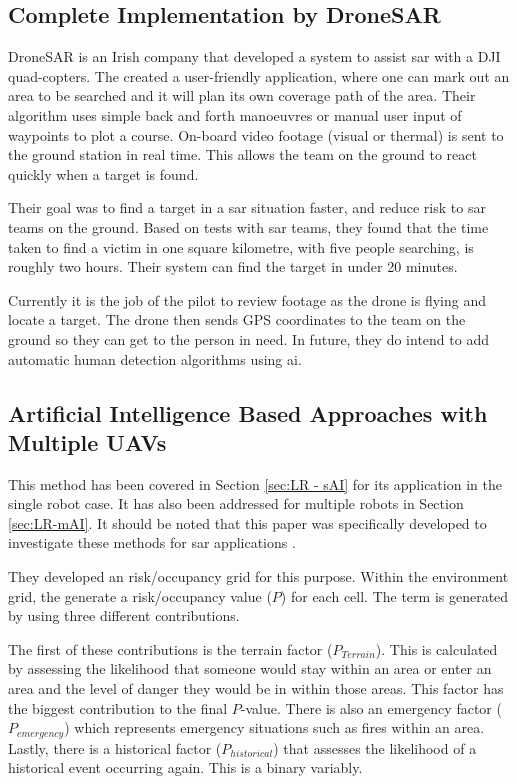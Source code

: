 \subsection{Complete Implementation by DroneSAR}
\label{sec:LR SAR-DroneSAR}
DroneSAR is an Irish company that developed a system to assist \acl{sar} with a DJI quad-copters. The created a user-friendly application, where one can mark out an area to be searched and it will plan its own coverage path of the area. Their algorithm uses simple back and forth manoeuvres or manual user input of waypoints to plot a course. On-board video footage (visual or thermal) is sent to the ground station in real time. This allows the team on the ground to react quickly when a target is found.  \cite{DroneSAR01}

Their goal was to find a target in a \acl{sar} situation faster, and reduce risk to \ac{sar} teams on the ground. Based on tests with \acl{sar} teams, they found that the time taken to find a victim in one square kilometre, with five people searching, is roughly two hours. Their system can find the target in under 20 minutes. \cite{DroneSAR01}
 
Currently it is the job of the pilot to review footage as the drone is flying and locate a target. The drone then sends GPS coordinates to the team on the ground so they can get to the person in need. In future, they do intend to add automatic human detection algorithms using \ac{ai}. \cite{DroneSARVideo}

\subsection{Artificial Intelligence Based Approaches with Multiple UAVs}
\label{sec:LR-SAR-AI}
This method has been covered in Section \ref{sec:LR - sAI} for its application in the single robot case. It has also been addressed for multiple robots in Section \ref{sec:LR-mAI}. It should be noted that this paper was specifically developed to investigate these methods for \acl{sar} applications \cite{Juan2018}.

They developed an risk/occupancy grid for this purpose. Within the environment grid, the generate a risk/occupancy value ($P$) for each cell. The term is generated by using three different contributions.

The first of these contributions is the terrain factor ($P_{Terrain}$). This is calculated by assessing the likelihood that someone would stay within an area or enter an area and the level of danger they would be in within those areas. This factor has the biggest contribution to the final $P$-value. There is also an emergency factor ($P_{emergency}$) which represents emergency situations such as fires within an area. Lastly, there is a historical factor ($P_{historical}$) that assesses the likelihood of a historical event occurring again. This is a binary variably.

